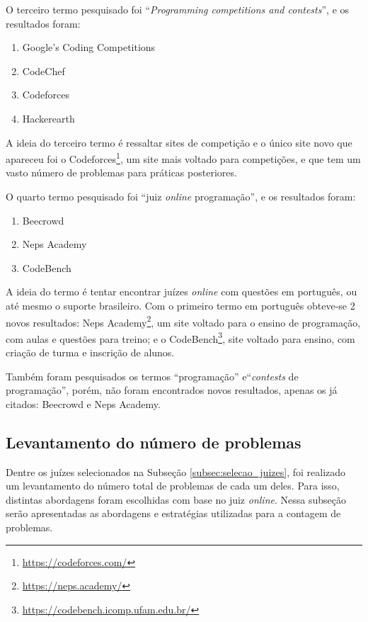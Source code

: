 O terceiro termo pesquisado foi ``\textit{Programming competitions and contests}'', e os resultados foram:

\begin{enumerate}
    \item Google's Coding Competitions
    \item CodeChef
    \item Codeforces
    \item Hackerearth
\end{enumerate}

A ideia do terceiro termo é ressaltar sites de competição e o único site novo que apareceu foi o Codeforces\footnote{\url{https://codeforces.com/}}, um site mais voltado para competições, e que tem um vasto número de problemas para práticas posteriores.

O quarto termo pesquisado foi ``juiz \textit{online} programação'', e os resultados foram:

\begin{enumerate}
    \item Beecrowd
    \item Neps Academy 
    \item CodeBench
\end{enumerate}

A ideia do termo é tentar encontrar juízes \textit{online} com questões em português, ou até mesmo o suporte brasileiro. Com o primeiro termo em português obteve-se 2 novos resultados: Neps Academy\footnote{\url{https://neps.academy/}}, um site voltado para o ensino de programação, com aulas e questões para treino; e o CodeBench\footnote{\url{https://codebench.icomp.ufam.edu.br/}}, site voltado para ensino, com criação de turma e inscrição de alunos. 

Também foram pesquisados os termos ``programação'' e``\textit{contests} de programação'', porém, não foram encontrados novos resultados, apenas os já citados: Beecrowd e Neps Academy.

\subsection{Levantamento do número de problemas}
\label{subsec:levantamento_numero_de_problemas}

Dentre os juízes selecionados na Subseção \ref{subsec:selecao_juizes}, foi realizado um levantamento do número total de problemas de cada um deles. Para isso, distintas abordagens foram escolhidas com base no juiz \textit{online}. Nessa subseção serão apresentadas as abordagens e estratégias utilizadas para a contagem de problemas.

